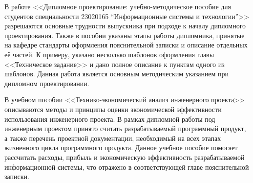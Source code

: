 В работе <<Дипломное проектирование: учебно-методическое пособие для студентов специальности 23020165 “Информационные системы и технологии”>> разрешаются основные трудности выпускника при подходе к началу дипломного проектирования.
Также в пособии указаны этапы работы дипломника, принятые на кафедре стандарты оформления пояснительной записки и описание отдельных её частей.
К примеру, указано несколько шаблонов оформления главы <<Техническое задание>> и дано полное описание к пунктам одного из шаблонов. 
Данная работа является основным методическим указанием при дипломном проектировании.

В учебном пособии <<Технико-экономический анализ инженерного проекта>> описываются методы и принципы оценки экономической эффективности использования инженерного проекта.
В рамках дипломной работы под инженерным проектом принято считать разрабатываемый программный продукт, а также перечень проектной документации, необходимый на всех этапах жизненного цикла программного продукта.
Данное учебное пособие помогает рассчитать расходы, прибыль и экономическую эффективность разрабатываемой информационной системы, что отражено в соответствующей главе пояснительной записки.

\clearpage
\newpage